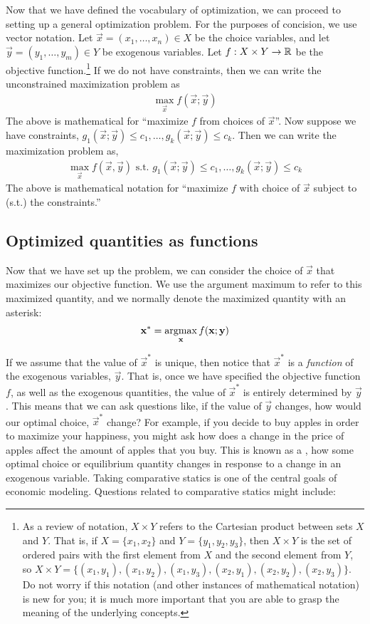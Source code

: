 Now that we have defined the vocabulary of optimization, we can proceed to setting up a general optimization problem. For the purposes of concision, we use vector notation. Let $\vec{x} = (x_1, \dots, x_n) \in X$ be the choice variables, and let $\vec{y} = (y_1, \dots, y_m) \in Y$ be exogenous variables. Let $f: X \times Y \to \mathbb{R}$ be the objective function.\footnote{As a review of notation, $X\times Y$ refers to the Cartesian product between sets $X$ and $Y$. That is, if $X = \{x_1, x_2\}$ and $Y = \{y_1, y_2, y_3\}$, then $X\times Y$ is the set of ordered pairs with the first element from $X$ and the second element from $Y$, so $X\times Y = \{(x_1, y_1), (x_1, y_2), (x_1, y_3), (x_2, y_1), (x_2, y_2), (x_2, y_3)\}.$ Do not worry if this notation (and other instances of mathematical notation) is new for you; it is much more important that you are able to grasp the meaning of the underlying concepts.} If we do not have constraints, then we can write the unconstrained maximization problem as
\begin{align*}
    \max_{\vec{x}} f(\vec{x}; \vec{y})
\end{align*}
The above is mathematical for ``maximize $f$ from choices of $\vec{x}$''. Now suppose we have constraints, $g_1(\vec{x}; \vec{y}) \leq c_1, \dots, g_k(\vec{x}; \vec{y}) \leq c_k$. Then we can write the maximization problem as,
\begin{align*}
    \max_{\vec{x}} f(\vec{x}, \vec{y}) \text{ s.t. } g_1(\vec{x}; \vec{y}) \leq c_1, \dots, g_k(\vec{x}; \vec{y}) \leq c_k
\end{align*}
The above is mathematical notation for ``maximize $f$ with choice of $\vec{x}$ subject to (s.t.) the constraints.'' 

\subsection*{Optimized quantities as functions}
Now that we have set up the problem, we can consider the choice of $\vec{x}$ that maximizes our objective function. We use the argument maximum to refer to this maximized quantity, and we normally denote the maximized quantity with an asterisk:
\begin{align*}
    \mathbf{x}^* = \operatorname*{arg max}_{\mathbf{x}} f(\mathbf{x}; \mathbf{y})
\end{align*}

If we assume that the value of $\vec{x}^*$ is unique, then notice that $\vec{x}^*$ is a \emph{function} of the exogenous variables, $\vec{y}$. That is, once we have specified the objective function $f$, as well as the exogenous quantities, the value of $\vec{x}^*$ is entirely determined by $\vec{y}$. This means that we can ask questions like, if the value of $\vec{y}$ changes, how would our optimal choice, $\vec{x}^*$ change? For example, if you decide to buy apples in order to maximize your happiness, you might ask how does a change in the price of apples affect the amount of apples that you buy. This is known as a , how some optimal choice or equilibrium quantity changes in response to a change in an exogenous variable. Taking comparative statics is one of the central goals of economic modeling. Questions related to comparative statics might include:

